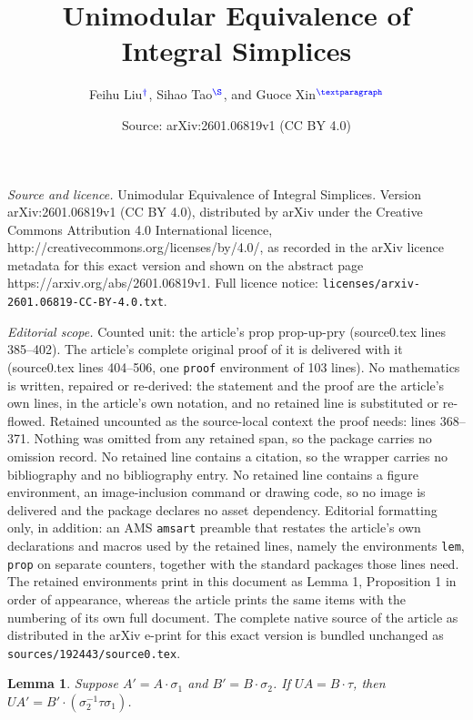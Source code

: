 \documentclass[10pt,a4paper]{amsart}
\title{Unimodular Equivalence of Integral Simplices}
\author{Feihu Liu$^{\color{blue} \dag}$, Sihao Tao$^{\color{blue} \S}$, and Guoce Xin$^{\color{blue} \P}$}
\date{Source: arXiv:2601.06819v1 (CC BY 4.0)}
\newtheorem{lem}{Lemma}
\begin{document}
\maketitle

\noindent\emph{Source and licence.} Unimodular Equivalence of Integral Simplices. Version arXiv:2601.06819v1 (CC BY 4.0), distributed by arXiv under the Creative Commons Attribution 4.0 International licence, http://creativecommons.org/licenses/by/4.0/, as recorded in the arXiv licence metadata for this exact version and shown on the abstract page https://arxiv.org/abs/2601.06819v1. Full licence notice: \texttt{licenses/arxiv-2601.06819-CC-BY-4.0.txt}.\par\smallskip

\noindent\textit{Editorial scope.} Counted unit: the article's prop prop-up-pry (source0.tex lines 385--402). The article's complete original proof of it is delivered with it (source0.tex lines 404--506, one \texttt{proof} environment of 103 lines). No mathematics is written, repaired or re-derived: the statement and the proof are the article's own lines, in the article's own notation, and no retained line is substituted or re-flowed.  Retained uncounted as the source-local context the proof needs: lines 368--371.  Nothing was omitted from any retained span, so the package carries no omission record.  No retained line contains a citation, so the wrapper carries no bibliography and no bibliography entry.  No retained line contains a figure environment, an image-inclusion command or drawing code, so no image is delivered and the package declares no asset dependency.  Editorial formatting only, in addition: an AMS \texttt{amsart} preamble that restates the article's own declarations and macros used by the retained lines, namely the environments \texttt{lem}, \texttt{prop} on separate counters, together with the standard packages those lines need.  The retained environments print in this document as Lemma 1, Proposition 1 in order of appearance, whereas the article prints the same items with the numbering of its own full document.  The complete native source of the article as distributed in the arXiv e-print for this exact version is bundled unchanged as \texttt{sources/192443/source0.tex}.
\begin{lem}\label{lem-permute-A-B}
Suppose $A'=A \cdot\sigma_1$ and $B'=B\cdot\sigma_2$.
 If $UA =B \cdot\tau$, then $ UA' = B' \cdot (\sigma_2^{-1} \tau \sigma_1) $.
\end{lem}
\end{document}
